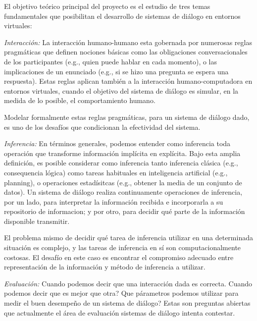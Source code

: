 
El objetivo te\'orico principal del proyecto es el estudio de
tres temas fundamentales que posibilitan el desarrollo
de sistemas de di\'alogo en entornos virtuales:
\begin{myitemize}
  \item \emph{Interacci\'on:} La interacci\'on humano-humano esta gobernada
  por numerosas reglas pragm\'aticas que definen nociones b\'asicas como
  las obligaciones conversacionales de los participantes (e.g., quien puede hablar en cada momento), o las implicaciones de un enunciado (e.g., si se
  hizo una pregunta se espera una respuesta).
  Estas reglas aplican tambi\'en a la interacci\'on humano-computadora en
  entornos virtuales, cuando el objetivo del sistema de di\'alogo es
  simular, en la medida de lo posible, el comportamiento humano.

  Modelar formalmente estas reglas pragm\'aticas, para un sistema de di\'alogo
  dado, es uno de los desaf\'ios que condicionan la efectividad del sistema.

  \item \emph{Inferencia:} En t\'erminos generales, podemos entender como
  inferencia toda operaci\'on que transforme informaci\'on impl\'icita en
  expl\'icita.  Bajo esta amplia definici\'on, es posible considerar como
  inferencia tanto inferencia cl\'asica (e.g., consequencia l\'ogica) como
  tareas habituales en inteligencia artificial (e.g., planning), o operaciones estad\'isitcas (e.g., obtener la media de un conjunto de datos).  Un sistema de di\'alogo realiza continuamente operaciones de inferencia, por un lado,
  para interpretar la informaci\'on recibida e incorporarla a su repositorio de informacion; y por otro, para decidir qu\'e parte de la informaci\'on disponible transmitir.

  El problema mismo de decidir qu\'e tarea de inferencia utilizar en una determinada situaci\'on es complejo, y las tareas de inferencia en s\'i son
  computacionalmente costosas.  El desaf\'io en este caso es encontrar el compromiso adecuado entre representaci\'on de la informaci\'on y m\'etodo
  de inferencia a utilizar.

  \item \emph{Evaluaci\'on:} Cuando podemos decir que una interacci\'on dada
  es correcta. Cuando podemos decir que es mejor que otra?  Que p\'arametros podemos utilizar para medir el buen desempe\~no de un sistema de di\'alogo?  Estas son preguntas abiertas que actualmente el \'area de evaluaci\'on sistemas de di\'alogo intenta contestar. 

\end{myitemize}

